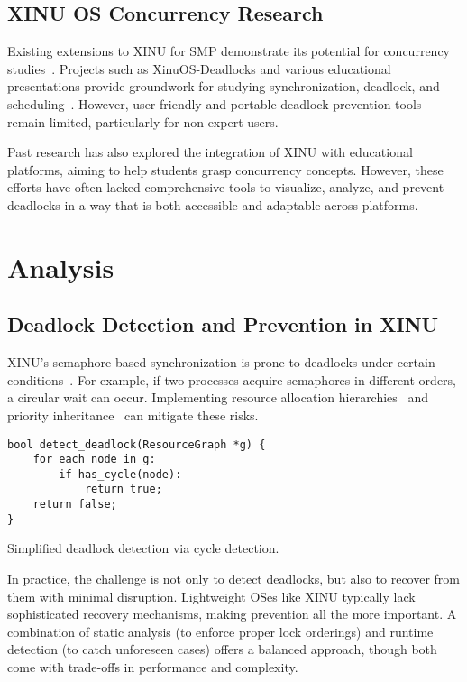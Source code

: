 \documentclass[conference,a4paper]{IEEEtran}
\begin{document}
\subsection{XINU OS Concurrency Research}

Existing extensions to XINU for SMP demonstrate its potential for concurrency studies~\cite{xinuosdeadlocks}. Projects such as XinuOS-Deadlocks and various educational presentations provide groundwork for studying synchronization, deadlock, and scheduling~\cite{buffalo, unc}. However, user-friendly and portable deadlock prevention tools remain limited, particularly for non-expert users.

Past research has also explored the integration of XINU with educational platforms, aiming to help students grasp concurrency concepts. However, these efforts have often lacked comprehensive tools to visualize, analyze, and prevent deadlocks in a way that is both accessible and adaptable across platforms.

\section{Analysis}

\subsection{Deadlock Detection and Prevention in XINU}

XINU’s semaphore-based synchronization is prone to deadlocks under certain conditions~\cite{buffalo}. For example, if two processes acquire semaphores in different orders, a circular wait can occur. Implementing resource allocation hierarchies~\cite{jetir} and priority inheritance~\cite{bbk, xinuosdeadlocks} can mitigate these risks.

\begin{listing}[ht]
\begin{verbatim}
bool detect_deadlock(ResourceGraph *g) {
    for each node in g:
        if has_cycle(node):
            return true;
    return false;
}
\end{verbatim}
\caption{Simplified deadlock detection via cycle detection.}
\end{listing}

In practice, the challenge is not only to detect deadlocks, but also to recover from them with minimal disruption. Lightweight OSes like XINU typically lack sophisticated recovery mechanisms, making prevention all the more important. A combination of static analysis (to enforce proper lock orderings) and runtime detection (to catch unforeseen cases) offers a balanced approach, though both come with trade-offs in performance and complexity.
\end{document}
